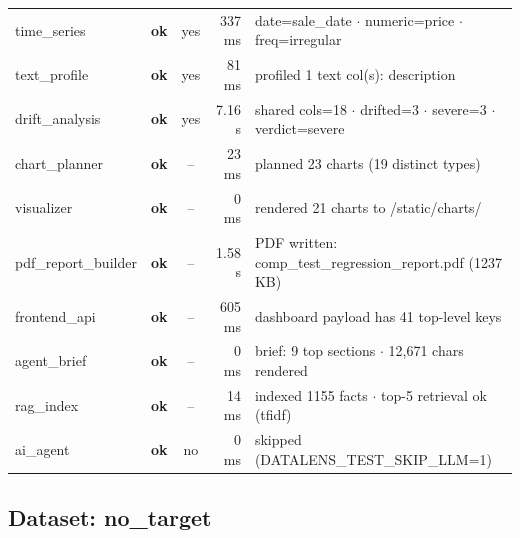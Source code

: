 \documentclass[11pt,a4paper]{article}
\begin{document}
\begin{tabularx}{\linewidth}{l c c r X}
  time\_series & \textcolor{ok}{\textbf{ok}} & \textcolor{ok}{yes} & 337 ms & date=sale\_date $\cdot$ numeric=price $\cdot$ freq=irregular \\
  text\_profile & \textcolor{ok}{\textbf{ok}} & \textcolor{ok}{yes} & 81 ms & profiled 1 text col(s): description \\
  drift\_analysis & \textcolor{ok}{\textbf{ok}} & \textcolor{ok}{yes} & 7.16 s & shared cols=18 $\cdot$ drifted=3 $\cdot$ severe=3 $\cdot$ verdict=severe \\
  chart\_planner & \textcolor{ok}{\textbf{ok}} & -- & 23 ms & planned 23 charts (19 distinct types) \\
  visualizer & \textcolor{ok}{\textbf{ok}} & -- & 0 ms & rendered 21 charts to /static/charts/ \\
  pdf\_report\_builder & \textcolor{ok}{\textbf{ok}} & -- & 1.58 s & PDF written: comp\_test\_regression\_report.pdf (1237 KB) \\
  frontend\_api & \textcolor{ok}{\textbf{ok}} & -- & 605 ms & dashboard payload has 41 top-level keys \\
  agent\_brief & \textcolor{ok}{\textbf{ok}} & -- & 0 ms & brief: 9 top sections $\cdot$ 12,671 chars rendered \\
  rag\_index & \textcolor{ok}{\textbf{ok}} & -- & 14 ms & indexed 1155 facts $\cdot$ top-5 retrieval ok (tfidf) \\
  ai\_agent & \textcolor{ok}{\textbf{ok}} & \textcolor{ink3}{no} & 0 ms & skipped (DATALENS\_TEST\_SKIP\_LLM=1) \\
\bottomrule
\end{tabularx}


\subsection*{Dataset: no\_target}
\end{document}
